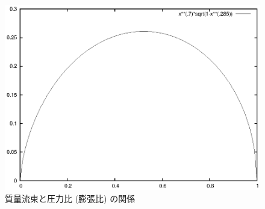 \begin{figure}[htbp]
 \begin{center}
  \includegraphics[width=450pt]{flux_vs_pressure.eps}
  \caption{質量流束と圧力比 (膨張比) の関係}
  \label{fig_flux_vs_pressure}
 \end{center}
\end{figure}

